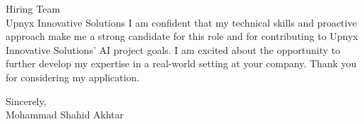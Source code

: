 \documentclass[10pt]{letter}
\begin{document}
\begin{letter}{Hiring Team\\Upnyx Innovative Solutions}
\vspace{0.5cm}
I am confident that my technical skills and proactive approach make me a strong candidate for this role and for contributing to Upnyx Innovative Solutions' AI project goals. I am excited about the opportunity to further develop my expertise in a real-world setting at your company. Thank you for considering my application.

\begin{flushleft}
\vspace{0.3cm}
Sincerely,\\[2ex]
Mohammad Shahid Akhtar
\end{flushleft}

\end{letter}
\end{document}
